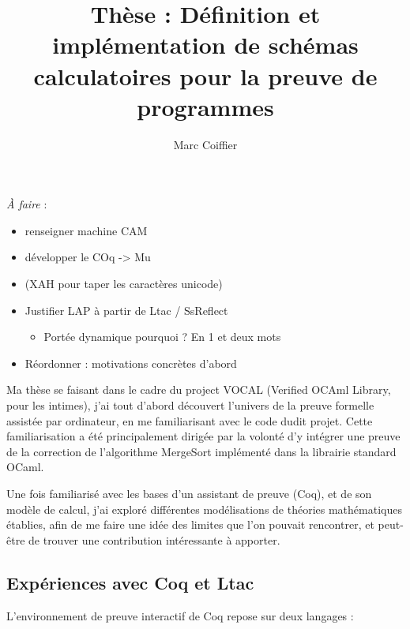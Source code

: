 \documentclass[]{easychair}
\title{Thèse : Définition et implémentation de schémas calculatoires pour la
preuve de programmes}
\author{Marc Coiffier}
\date{}
\providecommand{\tightlist}{%
  \setlength{\itemsep}{0pt}\setlength{\parskip}{0pt}}
\begin{document}
\maketitle

{
\hypersetup{linkcolor=black}
\setcounter{tocdepth}{3}
\tableofcontents
\newpage
}

\emph{À faire} :

\begin{itemize}
\tightlist
\item
  renseigner machine CAM
\item
  développer le COq -\textgreater{} Mu
\item
  (XAH pour taper les caractères unicode)
\item
  Justifier LAP à partir de Ltac / SsReflect

  \begin{itemize}
  \tightlist
  \item
    Portée dynamique pourquoi ? En 1 et deux mots
  \end{itemize}
\item
  Réordonner : motivations concrètes d'abord
\end{itemize}

Ma thèse se faisant dans le cadre du project VOCAL (Verified OCAml
Library, pour les intimes), j'ai tout d'abord découvert l'univers de la
preuve formelle assistée par ordinateur, en me familiarisant avec le
code dudit projet. Cette familiarisation a été principalement dirigée
par la volonté d'y intégrer une preuve de la correction de l'algorithme
MergeSort implémenté dans la librairie standard OCaml.

Une fois familiarisé avec les bases d'un assistant de preuve (Coq), et
de son modèle de calcul, j'ai exploré différentes modélisations de
théories mathématiques établies, afin de me faire une idée des limites
que l'on pouvait rencontrer, et peut-être de trouver une contribution
intéressante à apporter.

\subsection{Expériences avec Coq et
Ltac}\label{expuxe9riences-avec-coq-et-ltac}

L'environnement de preuve interactif de Coq repose sur deux langages :
\end{document}
